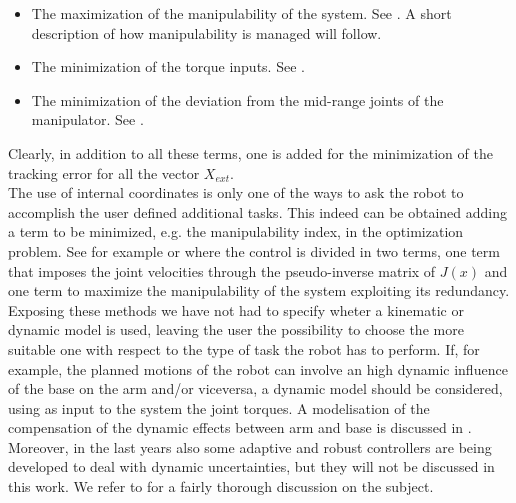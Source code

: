 \begin{itemize}
	\item The maximization of the manipulability of the system. See \cite{yamamoto}. A short description of how manipulability is managed will follow.
	\item The minimization of the torque inputs. See \cite{chen1997dynamic}.
	\item The minimization of the deviation from the mid-range joints of the manipulator. See \cite{khatib1999}.
\end{itemize}
Clearly, in addition to all these terms, one is added for the minimization of the tracking error for all the vector $X_{ext}$.\\
The use of internal coordinates is only one of the ways to ask the robot to accomplish the user defined additional tasks. This indeed can be obtained adding a term to be minimized, e.g. the manipulability index, in the optimization problem. See for example \cite{bayle1} or \cite{bayle2} where the control is divided in two terms, one term that imposes the joint velocities  through the pseudo-inverse matrix of $J(x)$ and one term to maximize the manipulability of the system exploiting its redundancy.\\
Exposing these methods we have not had to specify wheter a kinematic or dynamic model is used, leaving the user the possibility to choose the more suitable one with respect to the type of task the robot has to perform. If, for example, the planned motions of the robot can involve an high dynamic influence of the base on the arm and/or viceversa, a dynamic model should be considered, using as input to the system the joint torques. A modelisation of the compensation of the dynamic effects between arm and base is discussed in \cite{yamamoto1}.
Moreover, in the last years also some adaptive and robust controllers are being developed to deal with dynamic uncertainties, but they will not be discussed in this work. We refer to \cite{libromobilemanipulators} for a fairly thorough discussion on the subject.

